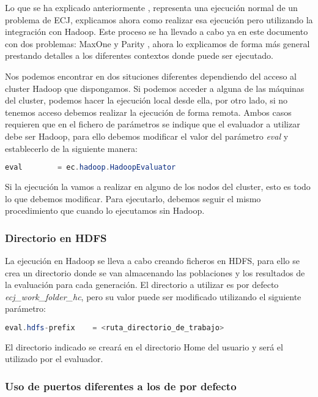Lo que se ha explicado anteriormente , representa una ejecuci\'on normal de un problema de ECJ, explicamos ahora como realizar esa ejecuci\'on pero utilizando la integraci\'on con Hadoop. Este proceso se ha llevado a cabo ya en este documento con dos problemas: MaxOne  y Parity , ahora lo explicamos de forma m\'as general prestando detalles a los diferentes contextos donde puede ser ejecutado.

Nos podemos encontrar en dos situciones diferentes dependiendo del acceso al cluster Hadoop que dispongamos. Si podemos acceder a alguna de las m\'aquinas del cluster, podemos hacer la ejecuci\'on local desde ella, por otro lado, si no tenemos acceso debemos realizar la ejecuci\'on de forma remota. Ambos casos requieren que en el fichero de par\'ametros se indique que el evaluador a utilizar debe ser Hadoop, para ello debemos modificar el valor del par\'ametro \textit{eval} y establecerlo de la siguiente manera:

\begin{lstlisting}[language=Java]
eval		= ec.hadoop.HadoopEvaluator
\end{lstlisting}

Si la ejecuci\'on la vamos a realizar en alguno de los nodos del cluster, esto es todo lo que debemos modificar. Para ejecutarlo, debemos seguir el mismo procedimiento que cuando lo ejecutamos sin Hadoop.

\subsubsection{Directorio en HDFS}

La ejecuci\'on en Hadoop se lleva a cabo creando ficheros en HDFS, para ello se crea un directorio donde se van almacenando las poblaciones y los resultados de la evaluaci\'on para cada generaci\'on. El directorio a utilizar es por defecto \textit{ecj\_work\_folder\_hc}, pero su valor puede ser modificado utilizando el siguiente par\'ametro:

\begin{lstlisting}[language=Java]
eval.hdfs-prefix	= <ruta_directorio_de_trabajo>
\end{lstlisting}

El directorio indicado se crear\'a en el directorio Home del usuario y ser\'a el utilizado por el evaluador.

\subsubsection{Uso de puertos diferentes a los de por defecto}

